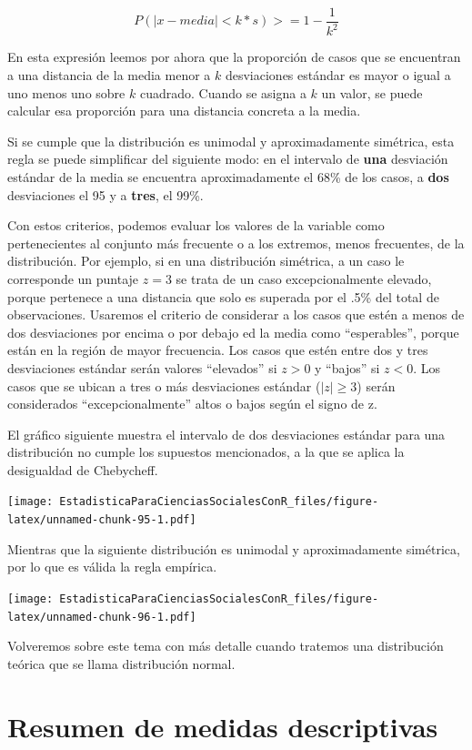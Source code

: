 \documentclass[]{book}
\begin{document}
\[P(|x-media|<k*s)>=1-\frac{1}{k^2}\]

En esta expresión leemos por ahora que la proporción de casos que se encuentran a una distancia de la media menor a \(k\) desviaciones estándar es mayor o igual a uno menos uno sobre \(k\) cuadrado. Cuando se asigna a \(k\) un valor, se puede calcular esa proporción para una distancia concreta a la media.

Si se cumple que la distribución es unimodal y aproximadamente simétrica, esta regla se puede simplificar del siguiente modo:
en el intervalo de \textbf{una} desviación estándar de la media se encuentra aproximadamente el 68\% de los casos, a \textbf{dos} desviaciones el 95 y a \textbf{tres}, el 99\%.

Con estos criterios, podemos evaluar los valores de la variable como pertenecientes al conjunto más frecuente o a los extremos, menos frecuentes, de la distribución. Por ejemplo, si en una distribución simétrica, a un caso le corresponde un puntaje \(z=3\) se trata de un caso excepcionalmente elevado, porque pertenece a una distancia que solo es superada por el .5\% del total de observaciones. Usaremos el criterio de considerar a los casos que estén a menos de dos desviaciones por encima o por debajo ed la media como ``esperables'', porque están en la región de mayor frecuencia. Los casos que estén entre dos y tres desviaciones estándar serán valores ``elevados'' si \(z>0\) y ``bajos'' si \(z<0\). Los casos que se ubican a tres o más desviaciones estándar (\(|z|\geq 3\)) serán considerados ``excepcionalmente'' altos o bajos según el signo de z.

El gráfico siguiente muestra el intervalo de dos desviaciones estándar para una distribución no cumple los supuestos mencionados, a la que se aplica la desigualdad de Chebycheff.

\texttt{[image: EstadisticaParaCienciasSocialesConR\_files/figure-latex/unnamed-chunk-95-1.pdf]}

Mientras que la siguiente distribución es unimodal y aproximadamente simétrica, por lo que es válida la regla empírica.

\texttt{[image: EstadisticaParaCienciasSocialesConR\_files/figure-latex/unnamed-chunk-96-1.pdf]}

Volveremos sobre este tema con más detalle cuando tratemos una distribución teórica que se llama distribución normal.

\hypertarget{resumen-de-medidas-descriptivas}{%
\section{Resumen de medidas descriptivas}\label{resumen-de-medidas-descriptivas}}
\end{document}
